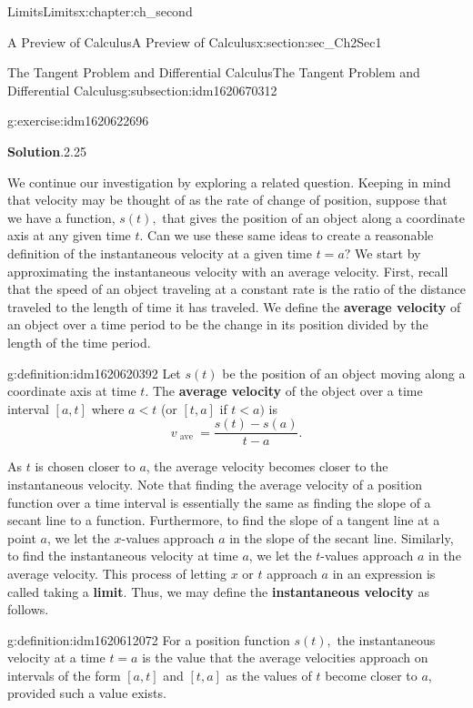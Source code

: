 \documentclass[oneside,10pt,]{book}
\newcommand{\blocktitlefont}{\relax}
\newcommand{\terminology}[1]{\textbf{#1}}
\numberwithin{equation}{section}
\newcommand{\lt}{<}
\begin{document}
\begin{chapterptx}{Limits}{}{Limits}{}{}{x:chapter:ch_second}
\begin{sectionptx}{A Preview of Calculus}{}{A Preview of Calculus}{}{}{x:section:sec_Ch2Sec1}
\begin{subsectionptx}{The Tangent Problem and Differential Calculus}{}{The Tangent Problem and Differential Calculus}{}{}{g:subsection:idm1620670312}
\begin{inlineexercise}{}{g:exercise:idm1620622696}
\par\smallskip%
\noindent\textbf{\blocktitlefont Solution}.\hypertarget{g:solution:idm1620618216}{}\quad{}2.25%
\end{inlineexercise}%
We continue our investigation by exploring a related question. Keeping in mind that velocity may be thought of as the rate of change of position, suppose that we have a function, \(s(t),\) that gives the position of an object along a coordinate axis at any given time \(t \). Can we use these same ideas to create a reasonable definition of the instantaneous velocity at a given time \(t=a?\) We start by approximating the instantaneous velocity with an average velocity. First, recall that the speed of an object traveling at a constant rate is the ratio of the distance traveled to the length of time it has traveled. We define the \terminology{average velocity} of an object over a time period to be the change in its position divided by the length of the time period.%
\begin{definition}{}{g:definition:idm1620620392}%
Let \(s(t)\) be the position of an object moving along a coordinate axis at time \(t \). The \terminology{average velocity} of the object over a time interval \([a,t]\) where \(a\lt t\) (or \([t,a]\) if \(t\lt a)\) is%
%
\begin{equation*}
v_{\text{ ave }}= \frac{s(t)-s(a)}{t-a}.
\end{equation*}
\end{definition}
As \(t \) is chosen closer to \(a\), the average velocity becomes closer to the instantaneous velocity. Note that finding the average velocity of a position function over a time interval is essentially the same as finding the slope of a secant line to a function. Furthermore, to find the slope of a tangent line at a point \(a\), we let the \(x\)-values approach \(a\) in the slope of the secant line. Similarly, to find the instantaneous velocity at time \(a\), we let the \(t \)-values approach \(a\) in the average velocity. This process of letting \(x\) or \(t \) approach \(a\) in an expression is called taking a \terminology{limit}. Thus, we may define the \terminology{instantaneous velocity} as follows.%
\begin{definition}{}{g:definition:idm1620612072}%
For a position function \(s(t),\) the instantaneous velocity at a time \(t=a\) is the value that the average velocities approach on intervals of the form \([a,t]\) and \([t,a]\) as the values of \(t \) become closer to \(a\), provided such a value exists.%
\end{definition}

\end{subsectionptx}
\end{sectionptx}
\end{chapterptx}
\end{document}
